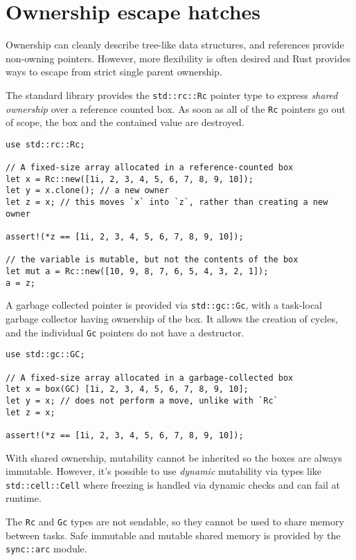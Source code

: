 \documentclass[]{article}
\begin{document}
\section{Ownership escape hatches}\label{ownership-escape-hatches}

Ownership can cleanly describe tree-like data structures, and references
provide non-owning pointers. However, more flexibility is often desired
and Rust provides ways to escape from strict single parent ownership.

The standard library provides the \texttt{std::rc::Rc} pointer type to
express \emph{shared ownership} over a reference counted box. As soon as
all of the \texttt{Rc} pointers go out of scope, the box and the
contained value are destroyed.

\begin{verbatim}
use std::rc::Rc;

// A fixed-size array allocated in a reference-counted box
let x = Rc::new([1i, 2, 3, 4, 5, 6, 7, 8, 9, 10]);
let y = x.clone(); // a new owner
let z = x; // this moves `x` into `z`, rather than creating a new owner

assert!(*z == [1i, 2, 3, 4, 5, 6, 7, 8, 9, 10]);

// the variable is mutable, but not the contents of the box
let mut a = Rc::new([10, 9, 8, 7, 6, 5, 4, 3, 2, 1]);
a = z;
\end{verbatim}

A garbage collected pointer is provided via \texttt{std::gc::Gc}, with a
task-local garbage collector having ownership of the box. It allows the
creation of cycles, and the individual \texttt{Gc} pointers do not have
a destructor.

\begin{verbatim}
use std::gc::GC;

// A fixed-size array allocated in a garbage-collected box
let x = box(GC) [1i, 2, 3, 4, 5, 6, 7, 8, 9, 10];
let y = x; // does not perform a move, unlike with `Rc`
let z = x;

assert!(*z == [1i, 2, 3, 4, 5, 6, 7, 8, 9, 10]);
\end{verbatim}

With shared ownership, mutability cannot be inherited so the boxes are
always immutable. However, it's possible to use \emph{dynamic}
mutability via types like \texttt{std::cell::Cell} where freezing is
handled via dynamic checks and can fail at runtime.

The \texttt{Rc} and \texttt{Gc} types are not sendable, so they cannot
be used to share memory between tasks. Safe immutable and mutable shared
memory is provided by the \texttt{sync::arc} module.
\end{document}
